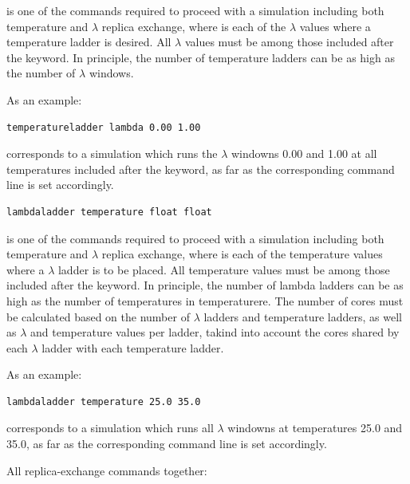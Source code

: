 \documentclass[letterpaper,10pt,english]{sphinxmanual}
\begin{document}
is one of the commands required to proceed with a simulation including both temperature and \(\lambda\) replica exchange, where  is each of the \(\lambda\) values where a temperature ladder is desired. All \(\lambda\) values must be among those included after the  keyword. In principle, the number of temperature ladders can be as high as the number of \(\lambda\) windows.

As an example:

\begin{Verbatim}[commandchars=\\\{\}]
temperatureladder lambda 0.00 1.00
\end{Verbatim}

corresponds to a simulation which runs the \(\lambda\) windowns 0.00 and 1.00 at all temperatures included after the  keyword, as far as the corresponding  command line is set accordingly.

\begin{Verbatim}[commandchars=\\\{\}]
lambdaladder temperature float float
\end{Verbatim}

is one of the commands required to proceed with a simulation including both temperature and \(\lambda\) replica exchange, where  is each of the temperature values where a \(\lambda\) ladder is to be placed. All temperature values must be among those included after the  keyword. In principle, the number of lambda ladders can be as high as the number of temperatures in temperaturere. The number of cores must be calculated based on the number of \(\lambda\) ladders and temperature ladders, as well as \(\lambda\) and temperature values per ladder, takind into account the cores shared by each \(\lambda\) ladder with each temperature ladder.

As an example:

\begin{Verbatim}[commandchars=\\\{\}]
lambdaladder temperature 25.0 35.0
\end{Verbatim}

corresponds to a simulation which runs all \(\lambda\) windowns at temperatures 25.0 and 35.0, as far as the corresponding  command line is set accordingly.

All replica-exchange commands together:
\end{document}
